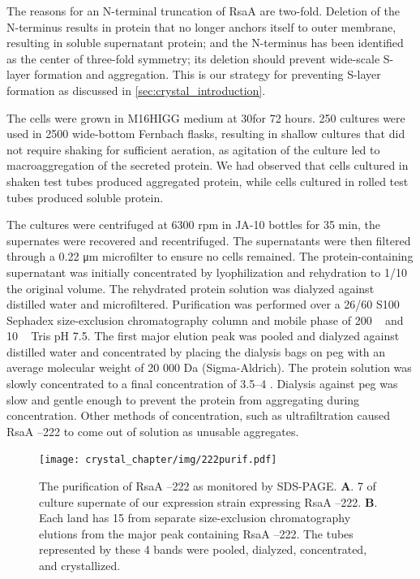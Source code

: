 The reasons for an N-terminal truncation of RsaA are two-fold. Deletion
of the N-terminus results in protein that no longer anchors itself to
outer membrane, resulting in soluble supernatant protein; and the
N-terminus has been identified as the center of three-fold symmetry; its
deletion should prevent wide-scale \ac{S-layer} formation and aggregation. This is our strategy for preventing \ac{S-layer} formation as discussed in \cref{sec:crystal_introduction}.

The cells were grown in M16HIGG medium
at 30\cel for 72 hours. 250 \millilitre cultures
were used in 2500 \millilitre wide-bottom Fernbach flasks, resulting in shallow
cultures that did not require shaking for sufficient aeration, as
agitation of the culture led to macroaggregation of the secreted
protein. We had observed that cells cultured in shaken test tubes produced
aggregated protein, while cells cultured in rolled test tubes produced soluble
protein.

 The cultures were centrifuged at 6300 rpm in JA-10 bottles for
35 min, the supernates were recovered and recentrifuged. The
supernatants were then filtered through a 0.22 \si{\micro\meter} microfilter to ensure
no cells remained. The protein-containing supernatant was initially
concentrated by lyophilization and rehydration to 1/10 the original
volume. The rehydrated protein solution was dialyzed against distilled
water and microfiltered. Purification was performed over a 26/60 S100
Sephadex size-exclusion chromatography column and mobile phase of 200 \si{\milli\molar}  and 10 \si{\milli\molar}
Tris pH 7.5. The first major elution peak was pooled and dialyzed
against distilled water and concentrated by placing the dialysis bags on
\ac{peg} with an average molecular weight of 20 000 Da (Sigma-Aldrich). The protein
solution was slowly concentrated to a final concentration of 3.5--4
\mgperml. Dialysis against \ac{peg} was slow and gentle enough to prevent the
protein from aggregating during concentration. Other methods of concentration,
such as ultrafiltration caused RsaA --222 to come out of solution as unusable aggregates.

\begin{figure}[htb]
  	\begin{center}
   		\texttt{[image: crystal\_chapter/img/222purif.pdf]}
   	\end{center}
   	\caption[Purification of RsaA --222 shown by \ac{SDS-PAGE}]{
      The purification of RsaA --222 as monitored by \ac{SDS-PAGE}.
      \textbf{A}. 7 \microlitre{} of culture supernate of our \caulobacter{}
      expression strain expressing RsaA --222. \textbf{B}. Each land has
      15 \microlitre{} from separate  size-exclusion chromatography elutions
      from the major peak containing RsaA --222. The tubes represented by
      these 4 bands were pooled, dialyzed, concentrated, and crystallized.
}
   	\label{fig:222purif}
\end{figure}   

